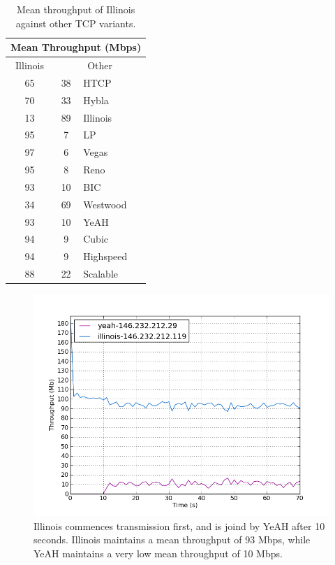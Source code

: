 \documentclass[11pt,a4paper,twocolumn]{article}
\begin{document}
\begin{table}[h!]
	\begin{center}
		\begin{tabular}{| c | c | l |}
    			\hline
			\multicolumn{3}{|c|}{Mean Throughput (Mbps)} \\
    			\hline
    			Illinois &  \multicolumn{2}{|c|}{Other}  \\
			\hline
    			65 & 38 & HTCP \\
			\hline
    			70 & 33 & Hybla \\
			\hline
    			13 & 89 & Illinois \\
			\hline
    			95 & 7 & LP \\
			\hline
    			97 & 6 & Vegas \\
			\hline
    			95 & 8 & Reno \\
			\hline
    			93 & 10 & BIC \\
			\hline
    			34 & 69 & Westwood \\
			\hline
    			93 & 10 & YeAH \\
			\hline
    			94 & 9 & Cubic \\
			\hline
    			94 & 9 & Highspeed \\
			\hline
    			88 & 22 & Scalable \\
    			\hline
    		\end{tabular}
  	\end{center}
  	\caption{Mean throughput of Illinois against other TCP variants.}
	\label{table:illinois}
\end{table}

\label{subsec:}
\begin{figure}[p]
	\includegraphics[width=\linewidth]{exp29.png}
	\caption{Illinois commences transmission first, and is joind by YeAH after 10 seconds. Illinois maintains
		a mean throughput of 93 Mbps, while YeAH maintains a very low mean throughput of 10 Mbps.}
	\label{fig:illinois_yeah}
\end{figure}
\end{document}

